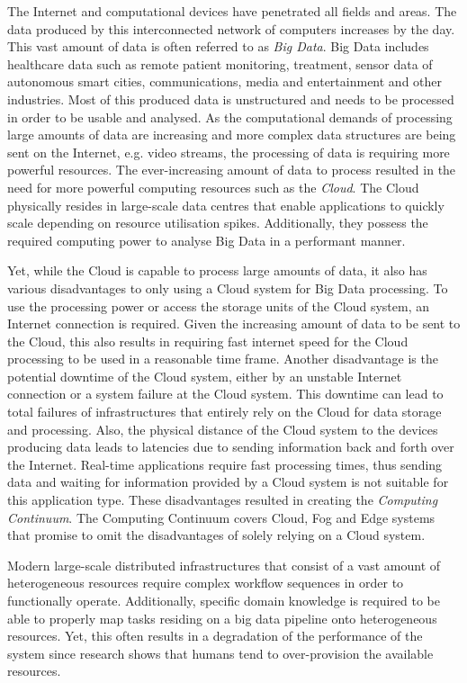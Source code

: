     The Internet and computational devices have penetrated all fields and areas. 
    The data produced by this interconnected network of computers increases by the day. 
    This vast amount of data is often referred to as \emph{Big Data}.
    Big Data includes healthcare data such as remote patient monitoring, treatment, sensor data of autonomous smart cities, communications, media and entertainment and other industries. 
    Most of this produced data is unstructured and needs to be processed in order to be usable and analysed.
    As the computational demands of processing large amounts of data are increasing and more complex data structures are being sent on the Internet, e.g. video streams, the processing of data is requiring more powerful resources.
    The ever-increasing amount of data to process resulted in the need for more powerful computing resources such as the \emph{Cloud}.
    The Cloud physically resides in large-scale data centres that enable applications to quickly scale depending on resource utilisation spikes. Additionally, they possess the required computing power to analyse Big Data in a performant manner.

    Yet, while the Cloud is capable to process large amounts of data, it also has various disadvantages to only using a Cloud system for Big Data processing. To use the processing power or access the storage units of the Cloud system, an Internet connection is required. Given the increasing amount of data to be sent to the Cloud, this also results in requiring fast internet speed for the Cloud processing to be used in a reasonable time frame. Another disadvantage is the potential downtime of the Cloud system, either by an unstable Internet connection or a system failure at the Cloud system. This downtime can lead to total failures of infrastructures that entirely rely on the Cloud for data storage and processing.
    Also, the physical distance of the Cloud system to the devices producing data leads to latencies due to sending information back and forth over the Internet. Real-time applications require fast processing times, thus sending data and waiting for information provided by a Cloud system is not suitable for this application type.
    These disadvantages resulted in creating the \emph{Computing Continuum}. 
    The Computing Continuum covers Cloud, Fog and Edge systems that promise to omit the disadvantages of solely relying on a Cloud system.
    
    Modern large-scale distributed infrastructures that consist of a vast amount of heterogeneous resources require complex workflow sequences in order to functionally operate. Additionally, specific domain knowledge is required to be able to properly map tasks residing on a big data pipeline onto heterogeneous resources. Yet, this often results in a degradation of the performance of the system since research shows that humans tend to over-provision the available resources.


